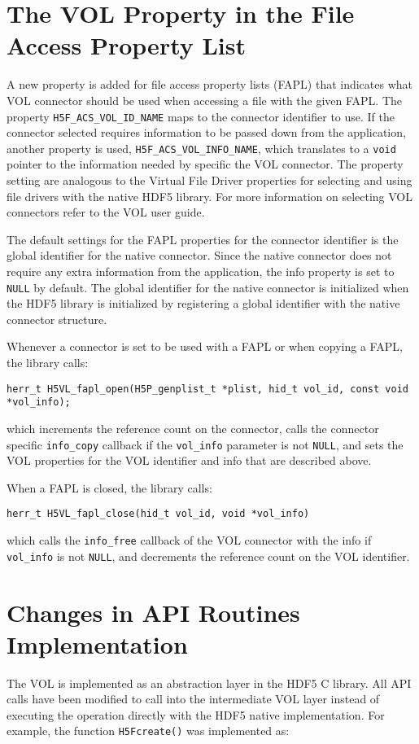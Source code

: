 \section{The VOL Property in the File Access Property List}
A new property is added for file access property lists (FAPL) that indicates what VOL connector should be used when accessing a file with the given FAPL. The property {\tt H5F\_ACS\_VOL\_ID\_NAME} maps to the connector identifier to use. If the connector selected requires information to be passed down from the application, another property is used, {\tt H5F\_ACS\_VOL\_INFO\_NAME}, which translates to a {\tt void} pointer to the information needed by specific the VOL connector. The property setting are analogous to the Virtual File Driver properties for selecting and using file drivers with the native HDF5 library. For more information on selecting VOL connectors refer to the VOL user guide.

The default settings for the FAPL properties for the connector identifier is the global identifier for the native connector. Since the native connector does not require any extra information from the application, the info property is set to {\tt NULL} by default. The global identifier for the native connector is initialized when the HDF5 library is initialized by registering a global identifier with the native connector structure. 

Whenever a connector is set to be used with a FAPL or when copying a FAPL, the library calls:
\begin{lstlisting}
herr_t H5VL_fapl_open(H5P_genplist_t *plist, hid_t vol_id, const void *vol_info);
\end{lstlisting}
which increments the reference count on the connector, calls the connector specific {\tt info\_copy} callback if the {\tt vol\_info} parameter is not {\tt NULL}, and sets the VOL properties for the VOL identifier and info that are described above.

When a FAPL is closed, the library calls:
\begin{lstlisting}
herr_t H5VL_fapl_close(hid_t vol_id, void *vol_info)
\end{lstlisting}
which calls the {\tt info\_free} callback of the VOL connector with the info if {\tt vol\_info} is not {\tt NULL}, and decrements the reference count on the VOL identifier. 

\section{Changes in API Routines Implementation}
The VOL is implemented as an abstraction layer in the HDF5 C library. All API calls have been modified to call into the intermediate VOL layer instead of executing the operation directly with the HDF5 native implementation. For example, the function {\tt H5Fcreate()} was implemented as:


